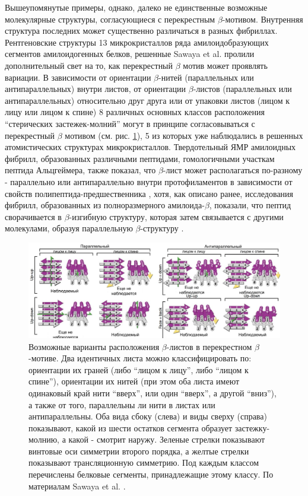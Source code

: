     Вышеупомянутые примеры, однако, далеко не единственные возможные молекулярные структуры, согласующиеся с перекрестным $\beta$-мотивом. Внутренняя структура последних может существенно различаться в разных фибриллах. Рентгеновские структуры 13 микрокристаллов ряда амилоидобразующих сегментов амилоидогенных белков, решенные Sawaya et al. \cite{sawaya_atomic_2007} пролили дополнительный свет на то, как перекрестный $\beta$ мотив может проявлять вариации. В зависимости от ориентации $\beta$-нитей (параллельных или антипараллельных) внутри листов, от ориентации $\beta$-листов (параллельных или антипараллельных) относительно друг друга или от упаковки листов (лицом к лицу или лицом к спине) 8 различных основных классов расположения ``стерических застежек-молний'' могут в принципе согласовываться с перекрестный $\beta$ мотивом (см. рис. \ref{fig:p4_p1_f3}), 5 из которых уже наблюдались в решенных атомистических структурах микрокристаллов. Твердотельный ЯМР амилоидных фибрилл, образованных различными пептидами, гомологичными участкам пептида Альцгеймера, также показал, что $\beta$-лист может располагаться по-разному - параллельно или антипараллельно внутри протофиламентов в зависимости от свойств полипептида-предшественника \cite{gordon_increasing_2004,balbach_supramolecular_2002,petkova_solid_2004,petkova_self-propagating_2005}, хотя, как описано ранее, исследования фибрилл, образованных из полноразмерного амилоида-$\beta$, показали, что пептид сворачивается в $\beta$-изгибную структуру, которая затем связывается с другими молекулами, образуя параллельную $\beta$-структуру \cite{petkova_experimental_2006,luhrs_3d_2005}.

\begin{figure} [H]
    \centering
    \includegraphics[width=\textwidth]{images/p4/punkt1/part4_p1_f3.pdf}
    \caption[Возможные варианты расположения $\beta$-листов в перекрестном $\beta$-мотиве]{Возможные варианты расположения $\beta$-листов в перекрестном $\beta$-мотиве. Два идентичных листа можно классифицировать по: ориентации их граней (либо ``лицом к лицу'', либо ``лицом к спине''), ориентации их нитей (при этом оба листа имеют одинаковый край нити ``вверх'', или один ``вверх'', а другой ``вниз''), а также от того, параллельны ли нити в листах или антипараллельны. Оба вида сбоку (слева) и виды сверху (справа) показывают, какой из шести остатков сегмента образует застежку-молнию, а какой - смотрит наружу. Зеленые стрелки показывают винтовые оси симметрии второго порядка, а желтые стрелки показывают трансляционную симметрию. Под каждым классом перечислены белковые сегменты, принадлежащие этому классу. По материалам Sawaya et al. \cite{sawaya_atomic_2007}.}
    \label{fig:p4_p1_f3}
\end{figure}

